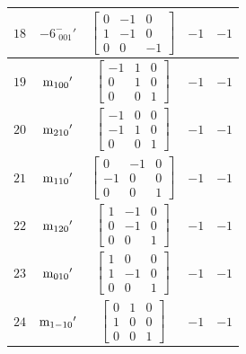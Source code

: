 \documentclass[fleqn,8pt]{jsarticle}
\begin{document}
\begin{longtable}{ccccc}
$ 18 $ & $ -6^{-}_{\,\,001}{}' $ & $ \begin{bmatrix} 0 & -1 & 0 \\ 1 & -1 & 0 \\ 0 & 0 & -1 \end{bmatrix} $ & $ -1 $ & $ -1 $ \\ \hline
$ 19 $ & $ {\rm m}_{100}{}' $ & $ \begin{bmatrix} -1 & 1 & 0 \\ 0 & 1 & 0 \\ 0 & 0 & 1 \end{bmatrix} $ & $ -1 $ & $ -1 $ \\ \hline
$ 20 $ & $ {\rm m}_{210}{}' $ & $ \begin{bmatrix} -1 & 0 & 0 \\ -1 & 1 & 0 \\ 0 & 0 & 1 \end{bmatrix} $ & $ -1 $ & $ -1 $ \\ \hline
$ 21 $ & $ {\rm m}_{110}{}' $ & $ \begin{bmatrix} 0 & -1 & 0 \\ -1 & 0 & 0 \\ 0 & 0 & 1 \end{bmatrix} $ & $ -1 $ & $ -1 $ \\ \hline
$ 22 $ & $ {\rm m}_{120}{}' $ & $ \begin{bmatrix} 1 & -1 & 0 \\ 0 & -1 & 0 \\ 0 & 0 & 1 \end{bmatrix} $ & $ -1 $ & $ -1 $ \\ \hline
$ 23 $ & $ {\rm m}_{010}{}' $ & $ \begin{bmatrix} 1 & 0 & 0 \\ 1 & -1 & 0 \\ 0 & 0 & 1 \end{bmatrix} $ & $ -1 $ & $ -1 $ \\ \hline
$ 24 $ & $ {\rm m}_{1-10}{}' $ & $ \begin{bmatrix} 0 & 1 & 0 \\ 1 & 0 & 0 \\ 0 & 0 & 1 \end{bmatrix} $ & $ -1 $ & $ -1 $ \\
\end{longtable}
\end{document}
